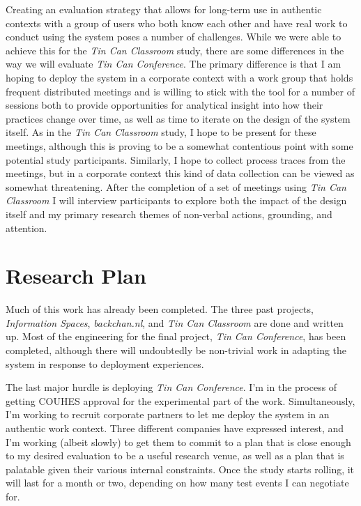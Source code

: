 \documentclass{tufte-handout}
\begin{document}
Creating an evaluation strategy that allows for long-term use in authentic contexts with a group of users who both know each other and have real work to conduct using the system poses a number of challenges. While we were able to achieve this for the \emph{Tin Can Classroom} study, there are some differences in the way we will evaluate \emph{Tin Can Conference}. The primary difference is that I am hoping to deploy the system in a corporate context with a work group that holds frequent distributed meetings and is willing to stick with the tool for a number of sessions both to provide opportunities for analytical insight into how their practices change over time, as well as time to iterate on the design of the system itself. As in the \emph{Tin Can Classroom} study, I hope to be present for these meetings, although this is proving to be a somewhat contentious point with some potential study participants. Similarly, I hope to collect process traces from the meetings, but in a corporate context this kind of data collection can be viewed as somewhat threatening. After the completion of a set of meetings using \emph{Tin Can Classroom} I will interview participants to explore both the impact of the design itself and my primary research themes of non-verbal actions, grounding, and attention.



\section{Research Plan}

Much of this work has already been completed. The three past projects, \emph{Information Spaces}, \emph{backchan.nl}, and \emph{Tin Can Classroom} are done and written up. Most of the engineering for the final project, \emph{Tin Can Conference}, has been completed, although there will undoubtedly be non-trivial work in adapting the system in response to deployment experiences.

The last major hurdle is deploying \emph{Tin Can Conference}. I'm in the process of getting COUHES approval for the experimental part of the work. Simultaneously, I'm working to recruit corporate partners to let me deploy the system in an authentic work context. Three different companies have expressed interest, and I'm working (albeit slowly) to get them to commit to a plan that is close enough to my desired evaluation to be a useful research venue, as well as a plan that is palatable given their various internal constraints. Once the study starts rolling, it will last for a month or two, depending on how many test events I can negotiate for.
\end{document}
